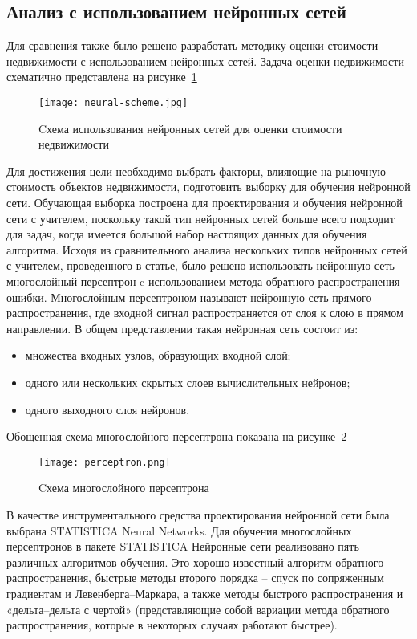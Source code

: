 \subsection{Анализ с использованием нейронных сетей}
\label{sec:experiment:neural_engines}

Для сравнения также было решено разработать методику оценки стоимости недвижимости с использованием
нейронных сетей. Задача оценки недвижимости схематично представлена на рисунке~\ref{fig:experiment:neural-scheme}

\begin{figure}[!ht]
  \centering
  \texttt{[image: neural-scheme.jpg]} 
  \caption{Cхема использования нейронных сетей для оценки стоимости недвижимости}
  \label{fig:experiment:neural-scheme}
\end{figure}

Для достижения цели необходимо выбрать факторы, влияющие на	рыночную стоимость объектов недвижимости, подготовить выборку для
обучения нейронной сети. Обучающая выборка построена для проектирования и обучения нейронной сети с учителем,
поскольку такой тип нейронных сетей больше всего подходит для задач, когда имеется большой набор настоящих данных для обучения
алгоритма. Исходя из сравнительного анализа нескольких типов нейронных сетей с учителем, проведенного в статье, было
решено использовать нейронную сеть многослойный персептрон c использованием метода обратного распространения ошибки.
Многослойным персептроном называют нейронную сеть прямого распространения, где входной сигнал распространяется от слоя
к слою в прямом направлении. В общем представлении такая нейронная сеть состоит из:
\begin{itemize}
  \item множества входных узлов, образующих входной слой;
  \item одного или нескольких скрытых слоев вычислительных нейронов;
  \item одного выходного слоя нейронов.
\end{itemize}

Обощенная схема многослойного персептрона показана на рисунке~\ref{fig:experiment:perceptron-scheme}
\begin{figure}[!ht]
  \centering
  \texttt{[image: perceptron.png]}
  \caption{Cхема многослойного персептрона}
  \label{fig:experiment:perceptron-scheme}
\end{figure}

В качестве инструментального средства проектирования нейронной сети была выбрана STATISTICA Neural Networks.
Для обучения многослойных персептронов в пакете STATISTICA Нейронные сети реализовано пять различных алгоритмов
обучения. Это хорошо известный алгоритм обратного распространения, быстрые методы второго порядка – спуск по сопряженным
градиентам и Левенберга–Маркара, а также методы быстрого распространения и «дельта–дельта с чертой» (представляющие
собой вариации метода обратного распространения, которые в некоторых случаях работают быстрее).

